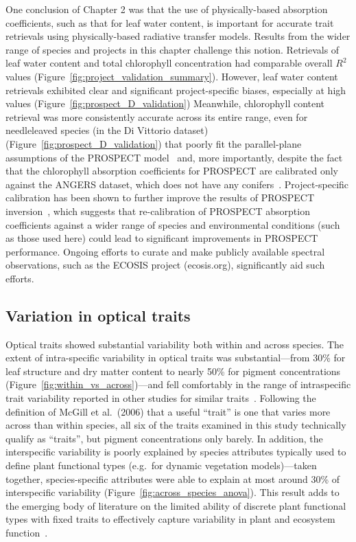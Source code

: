 One conclusion of Chapter 2 was that the use of physically-based absorption coefficients, such as that for leaf water content, is important for accurate trait retrievals using physically-based radiative transfer models.
Results from the wider range of species and projects in this chapter challenge this notion.
Retrievals of leaf water content and total chlorophyll concentration had comparable overall $R^2$ values (Figure~\ref{fig:project_validation_summary}).
However, leaf water content retrievals exhibited clear and significant project-specific biases, especially at high values (Figure~\ref{fig:prospect_D_validation})
Meanwhile, chlorophyll content retrieval was more consistently accurate across its entire range, even for needleleaved species (in the Di Vittorio dataset) (Figure~\ref{fig:prospect_D_validation}) that poorly fit the parallel-plane assumptions of the PROSPECT model~\cite{allen_1969_interaction,jacquemoud_1990_prospect} and, more importantly, despite the fact that the chlorophyll absorption coefficients for PROSPECT are calibrated only against the ANGERS dataset, which does not have any conifers~\cite{feret_2008_prospect,feret_2017_prospectd}.
Project-specific calibration has been shown to further improve the results of PROSPECT inversion~\cite{li_2013_retrieval}, which suggests that re-calibration of PROSPECT absorption coefficients against a wider range of species and environmental conditions (such as those used here) could lead to significant improvements in PROSPECT performance.
Ongoing efforts to curate and make publicly available spectral observations, such as the ECOSIS project (ecosis.org), significantly aid such efforts.

\subsection{Variation in optical traits}

Optical traits showed substantial variability both within and across species.
The extent of intra-specific variability in optical traits was substantial---from 30\% for leaf structure and dry matter content to nearly 50\% for pigment concentrations (Figure~\ref{fig:within_vs_across})---and fell comfortably in the range of intraspecific trait variability reported in other studies for similar traits~\cite{messier_how_2010,albert_multi-trait_2010}.
Following the definition of McGill et al.~(2006) that a useful ``trait'' is one that varies more across than within species, all six of the traits examined in this study technically qualify as ``traits'', but pigment concentrations only barely. \nocite{mcgill_2006_rebuilding}
In addition, the interspecific variability is poorly explained by species attributes typically used to define plant functional types (e.g.\ for dynamic vegetation models)---taken together, species-specific attributes were able to explain at most around 30\% of interspecific variability (Figure~\ref{fig:across_species_anova}).
This result adds to the emerging body of literature on the limited ability of discrete plant functional types with fixed traits to effectively capture variability in plant and ecosystem function~\cite{vanbodegom2012_beyond,vanbodegom2014_fully,verheijen2015_variation,clark_why_2016}.

